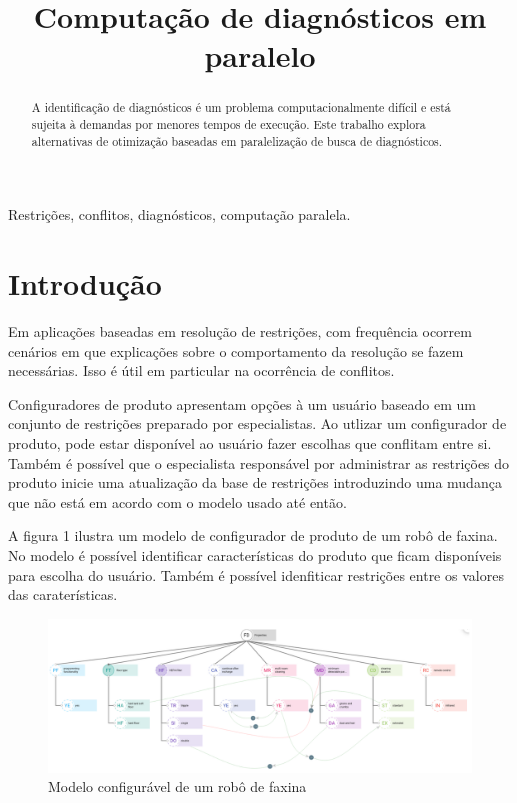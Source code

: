 \documentclass[conference]{IEEEtran}
\begin{document}
\title{Computação de diagnósticos em paralelo\\
}

\author{
}

\maketitle

\begin{abstract}
A identificação de diagnósticos é um problema computacionalmente difícil e está sujeita à demandas por menores tempos de execução. Este trabalho explora alternativas de otimização baseadas em paralelização de busca de diagnósticos.
\end{abstract}

\begin{IEEEkeywords}
Restrições, conflitos, diagnósticos, computação paralela.
\end{IEEEkeywords}

\section{Introdução}

Em aplicações baseadas em resolução de restrições, com frequência ocorrem cenários em que explicações sobre o comportamento da resolução se fazem necessárias. Isso é útil em particular na ocorrência de conflitos.

Configuradores de produto apresentam opções à um usuário baseado em um conjunto de restrições preparado por especialistas. Ao utlizar um configurador de produto, pode estar disponível ao usuário fazer escolhas que conflitam entre si. Também é possível que o especialista responsável por administrar as restrições do produto inicie uma atualização da base de restrições introduzindo uma mudança que não está em acordo com o modelo usado até então.

A figura 1 ilustra um modelo de configurador de produto de um robô de faxina. No modelo é possível identificar características do produto que ficam disponíveis para escolha do usuário. Também é possível idenfiticar restrições entre os valores das caraterísticas.

\begin{figure}[htbp]
\centerline{\includegraphics[width=0.7\columnwidth]{model.png}}
\caption{Modelo configurável de um robô de faxina} 
\label{fig}
\end{figure}
\end{document}
